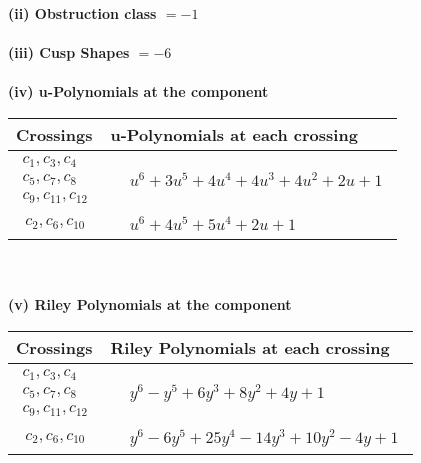 \documentclass[1p]{elsarticle_modified}
\theoremstyle{definition}
\begin{document}
\flushleft \textbf{(ii) Obstruction class $= -1$}\\~\\
\flushleft \textbf{(iii) Cusp Shapes $= -6$}\\~\\
\newpage\renewcommand{\arraystretch}{1}
\flushleft \textbf{(iv) u-Polynomials at the component}\newline \\
\begin{tabular}{m{50pt}|m{274pt}}
Crossings & \hspace{64pt}u-Polynomials at each crossing \\
\hline $$\begin{aligned}c_{1},c_{3},c_{4}\\c_{5},c_{7},c_{8}\\c_{9},c_{11},c_{12}\end{aligned}$$&$\begin{aligned}
&u^6+3 u^5+4 u^4+4 u^3+4 u^2+2 u+1
\end{aligned}$\\
\hline $$\begin{aligned}c_{2},c_{6},c_{10}\end{aligned}$$&$\begin{aligned}
&u^6+4 u^5+5 u^4+2 u+1
\end{aligned}$\\
\hline
\end{tabular}\\~\\
\newpage\renewcommand{\arraystretch}{1}
\flushleft \textbf{(v) Riley Polynomials at the component}\newline \\
\begin{tabular}{m{50pt}|m{274pt}}
Crossings & \hspace{64pt}Riley Polynomials at each crossing \\
\hline $$\begin{aligned}c_{1},c_{3},c_{4}\\c_{5},c_{7},c_{8}\\c_{9},c_{11},c_{12}\end{aligned}$$&$\begin{aligned}
&y^6- y^5+6 y^3+8 y^2+4 y+1
\end{aligned}$\\
\hline $$\begin{aligned}c_{2},c_{6},c_{10}\end{aligned}$$&$\begin{aligned}
&y^6-6 y^5+25 y^4-14 y^3+10 y^2-4 y+1
\end{aligned}$\\
\hline
\end{tabular}\\~\\
\end{document}
